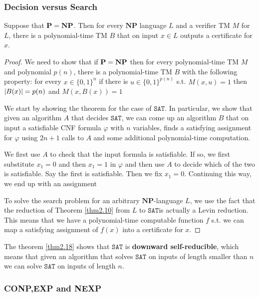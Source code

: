 \documentclass[11pt]{article}
\def \NP {\textbf{NP}}
\def \SAT {\text{SAT}}
\def \NP {\textbf{NP}}
\def \SAT {\texttt{SAT}}
\begin{document}
\subsubsection{Decision versus Search}
\label{sec:org79a1d97}
\begin{theorem}[]
\label{thm2.18}
Suppose that \(\bP=\NP\). Then for every \(\NP\) language \(L\) and a verifier TM \(M\)
for \(L\), there is a polynomial-time TM \(B\) that on input \(x\in L\) outputs a certificate
for \(x\).
\end{theorem}

\begin{proof}
We need to show that if \(\bP=\NP\) then for every polynomial-time TM \(M\) and
polynomial \(p(n)\), there is a polynomial-time TM \(B\) with the following property: for every
\(x\in\{0,1\}^n\) if there is \(u\in\{0,1\}^{p(n)}\) s.t. \(M(x,u)=1\) then \(\abs{B(x)}=p(n)\)
and \(M(x,B(x))=1\)

We start by showing the theorem for the case of \(\SAT\). In particular, we show that given an
algorithm \(A\) that decides \(\SAT\), we can come up an algorithm \(B\) that on input a
satisfiable CNF formula \(\varphi\) with \(n\) variables, finds a satisfying assignment for \(\varphi\)
using \(2n+1\) calls to \(A\) and some additional polynomial-time computation.

We first use \(A\) to check that the input formula is satisfiable. If so, we first
substitute \(x_1=0\) and then \(x_1=1\) in \(\varphi\) and then use \(A\) to decide which of the two is
satisfiable. Say the first is satisfiable. Then we fix \(x_1=0\). Continuing this way, we end
up with an assignment

To solve the search problem for an arbitrary \(\NP\)-language \(L\), we use the fact that the
reduction of Theorem \ref{thm2.10} from \(L\) to \(\SAT\)is actually a Levin reduction. This
means that we have a polynomial-time computable function \(f\) s.t. we can map a satisfying
assignment of \(f(x)\) into a certificate for \(x\).
\end{proof}

The theorem \ref{thm2.18} shows that \(\SAT\) is \textbf{downward self-reducible}, which means that
given an algorithm that solves \(\SAT\) on inputs of length smaller than \(n\) we can
solve \(\SAT\) on inputs of length \(n\).

\subsubsection{\textbf{CONP,EXP} and \textbf{NEXP}}
\label{sec:org3dcb690}
\end{document}
